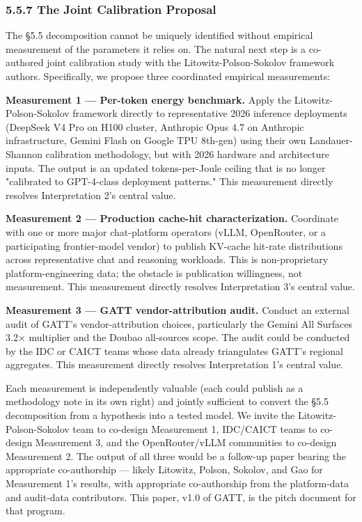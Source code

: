 \documentclass[11pt,a4paper]{article}
\begin{document}
\subsubsection{5.5.7 The Joint Calibration Proposal}

The §5.5 decomposition cannot be uniquely identified without empirical measurement of the parameters it relies on. The natural next step is a co-authored joint calibration study with the Litowitz-Polson-Sokolov framework authors. Specifically, we propose three coordinated empirical measurements:

\textbf{Measurement 1 --- Per-token energy benchmark.} Apply the Litowitz-Polson-Sokolov framework directly to representative 2026 inference deployments (DeepSeek V4 Pro on H100 cluster, Anthropic Opus 4.7 on Anthropic infrastructure, Gemini Flash on Google TPU 8th-gen) using their own Landauer-Shannon calibration methodology, but with 2026 hardware and architecture inputs. The output is an updated tokens-per-Joule ceiling that is no longer "calibrated to GPT-4-class deployment patterns." This measurement directly resolves Interpretation 2's central value.

\textbf{Measurement 2 --- Production cache-hit characterization.} Coordinate with one or more major chat-platform operators (vLLM, OpenRouter, or a participating frontier-model vendor) to publish KV-cache hit-rate distributions across representative chat and reasoning workloads. This is non-proprietary platform-engineering data; the obstacle is publication willingness, not measurement. This measurement directly resolves Interpretation 3's central value.

\textbf{Measurement 3 --- GATT vendor-attribution audit.} Conduct an external audit of GATT's vendor-attribution choices, particularly the Gemini All Surfaces 3.2× multiplier and the Doubao all-sources scope. The audit could be conducted by the IDC or CAICT teams whose data already triangulates GATT's regional aggregates. This measurement directly resolves Interpretation 1's central value.

Each measurement is independently valuable (each could publish as a methodology note in its own right) and jointly sufficient to convert the §5.5 decomposition from a hypothesis into a tested model. We invite the Litowitz-Polson-Sokolov team to co-design Measurement 1, IDC/CAICT teams to co-design Measurement 3, and the OpenRouter/vLLM communities to co-design Measurement 2. The output of all three would be a follow-up paper bearing the appropriate co-authorship --- likely Litowitz, Polson, Sokolov, and Gao for Measurement 1's results, with appropriate co-authorship from the platform-data and audit-data contributors. This paper, v1.0 of GATT, is the pitch document for that program.
\end{document}
